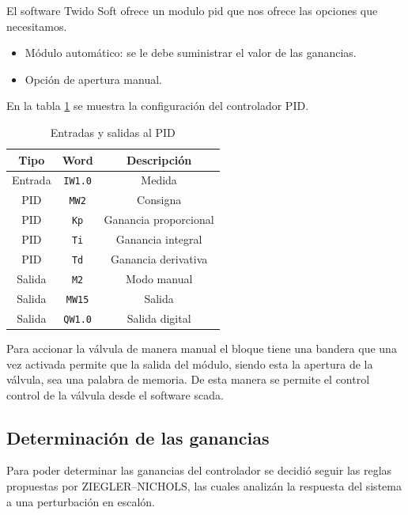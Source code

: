El software Twido Soft ofrece un modulo \gls{pid} que nos ofrece las
opciones que necesitamos.

\begin{itemize}
 \item Módulo automático: se le debe suministrar el valor de las ganancias. 
 \item Opción de apertura manual.
\end{itemize}

En la tabla \ref{table:controladorpid} se muestra la configuración del 
controlador PID.

\begin{table}[!t]

\renewcommand{\arraystretch}{1.3}
\centering
\begin{tabular}{c||c||c}
\hline
\bfseries Tipo & \bfseries Word  & \bfseries Descripción\\
\hline \hline
Entrada & \verb|IW1.0|  & Medida\\
\hline
PID & \verb|MW2|  & Consigna\\
PID & \verb|Kp|  & Ganancia proporcional\\
PID & \verb|Ti|  & Ganancia integral\\
PID & \verb|Td|  & Ganancia derivativa\\
\hline
Salida & \verb|M2|  & Modo manual\\
Salida & \verb|MW15|  & Salida\\
Salida & \verb|QW1.0|  & Salida digital\\
\hline
\end{tabular}
\caption{Entradas y salidas al PID}
\label{table:controladorpid}
\end{table}

Para accionar la válvula de manera manual el bloque tiene una bandera
que una vez activada permite que la salida del módulo, siendo esta la 
apertura de la válvula, sea una palabra de memoria. De esta manera se 
permite el control control de la válvula desde el software \gls{scada}.

\subsection{Determinación de las ganancias}

Para poder determinar las ganancias del controlador se decidió seguir
las reglas propuestas por ZIEGLER–NICHOLS, las cuales analizán la respuesta
del sistema a una perturbación en escalón.

